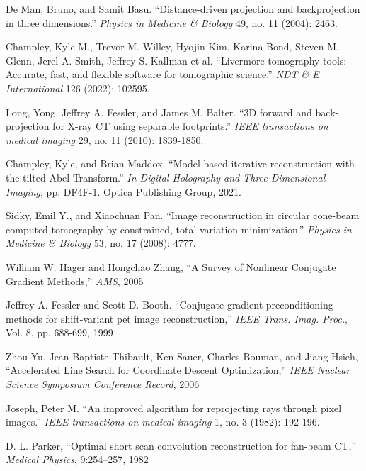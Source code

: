 \documentclass[11pt]{article}
\begin{document}


\begin{thebibliography}{100}

 De Man, Bruno, and Samit Basu. ``Distance-driven projection and backprojection in three dimensions.'' \emph{Physics in Medicine \& Biology} 49, no. 11 (2004): 2463.

 Champley, Kyle M., Trevor M. Willey, Hyojin Kim, Karina Bond, Steven M. Glenn, Jerel A. Smith, Jeffrey S. Kallman et al. ``Livermore tomography tools: Accurate, fast, and flexible software for tomographic science.'' \emph{NDT \& E International} 126 (2022): 102595.

 Long, Yong, Jeffrey A. Fessler, and James M. Balter. ``3D forward and back-projection for X-ray CT using separable footprints.'' \emph{IEEE transactions on medical imaging} 29, no. 11 (2010): 1839-1850.

 Champley, Kyle, and Brian Maddox. ``Model based iterative reconstruction with the tilted Abel Transform.'' \emph{In Digital Holography and Three-Dimensional Imaging}, pp. DF4F-1. Optica Publishing Group, 2021.

 Sidky, Emil Y., and Xiaochuan Pan. ``Image reconstruction in circular cone-beam computed tomography by constrained, total-variation minimization.'' \emph{Physics in Medicine \& Biology} 53, no. 17 (2008): 4777.

 William W. Hager and Hongchao Zhang, ``A Survey of Nonlinear Conjugate Gradient Methods,'' \emph{AMS}, 2005

Jeffrey A. Fessler and Scott D. Booth. ``Conjugate-gradient preconditioning methods for shift-variant pet image reconstruction,'' \emph{IEEE Trans. Imag. Proc.}, Vol. 8, pp. 688-699, 1999

 Zhou Yu, Jean-Baptiste Thibault, Ken Sauer, Charles Bouman, and Jiang Hsieh, ``Accelerated Line Search for Coordinate Descent
Optimization,'' \emph{IEEE Nuclear Science Symposium Conference Record}, 2006

 Joseph, Peter M. ``An improved algorithm for reprojecting rays through pixel images.'' \emph{IEEE transactions on medical imaging} 1, no. 3 (1982): 192-196.

 D. L. Parker, ``Optimal short scan convolution reconstruction for fan-beam CT,'' \emph{Medical Physics}, 9:254–257, 
1982


\end{thebibliography}
\end{document}
